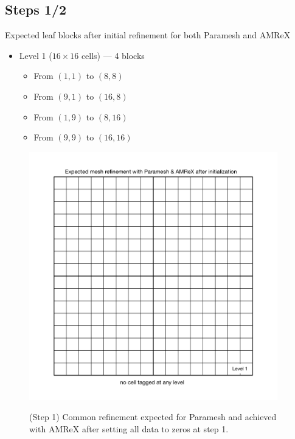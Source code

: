 \documentclass[12pt,letterpaper]{article}
\begin{document}
\newpage
\subsection{Steps 1/2}
Expected leaf blocks after initial refinement for both Paramesh and AMReX
\begin{itemize}
\item{Level 1 ($16 \times 16$ cells) --- 4 blocks}
    \begin{itemize}
    \item{From $(1,1)$ to $(8,8)$}
    \item{From $(9,1)$ to $(16,8)$}
    \item{From $(1,9)$ to $(8,16)$}
    \item{From $(9,9)$ to $(16,16)$}
    \end{itemize}
\end{itemize}

\begin{figure}[!hp]
\begin{center}
\includegraphics[width=4.25in]{TestRefine_Step1_Both.pdf}\\
\caption{(Step 1) Common refinement expected for Paramesh and achieved with AMReX after
setting all data to zeros at step 1.}
\end{center}
\end{figure}

\newpage
\end{document}
